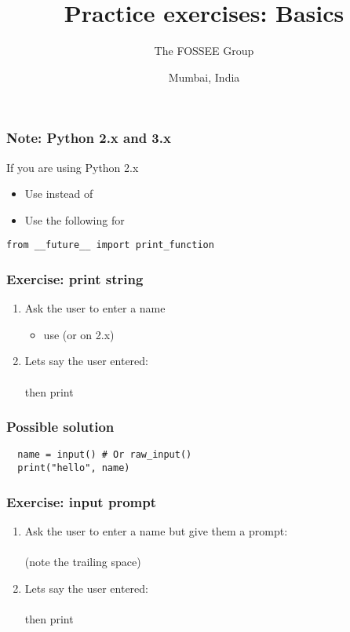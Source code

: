 \documentclass[14pt,compress]{beamer}
\title[Basic Python]{Practice exercises: Basics}
\author[FOSSEE Team] {The FOSSEE Group}
\institute[FOSSEE -- IITB] {Department of Aerospace Engineering\\IIT Bombay}
\date[] {Mumbai, India}
\begin{document}
\begin{frame}
  \titlepage
\end{frame}

\begin{frame}
  \frametitle{Note: Python 2.x and 3.x}

 If you are using Python 2.x
  \begin{itemize}
  \item Use  instead of 
  \item Use the following for 
  \end{itemize}
 \begin{lstlisting}
from __future__ import print_function
\end{lstlisting}
\end{frame}

\begin{frame}[plain]
  \frametitle{Exercise: print string}
  \begin{enumerate}
  \item Ask the user to enter a name
    \begin{itemize}
    \item use  (or  on 2.x)
    \end{itemize}
  \item Lets say the user entered: \\ \\  then print \\ 
  \end{enumerate}
\end{frame}

\begin{frame}
\frametitle{Possible solution}
\begin{lstlisting}
  name = input() # Or raw_input()
  print("hello", name)
\end{lstlisting}

\end{frame}


\begin{frame}[plain]
  \frametitle{Exercise: input prompt}
  \begin{enumerate}
  \item Ask the user to enter a name but give them a prompt:\\  \\ (note the trailing space)
  \item Lets say the user entered: \\ \\  then print \\ 
  \end{enumerate}
\end{frame}
\end{document}
